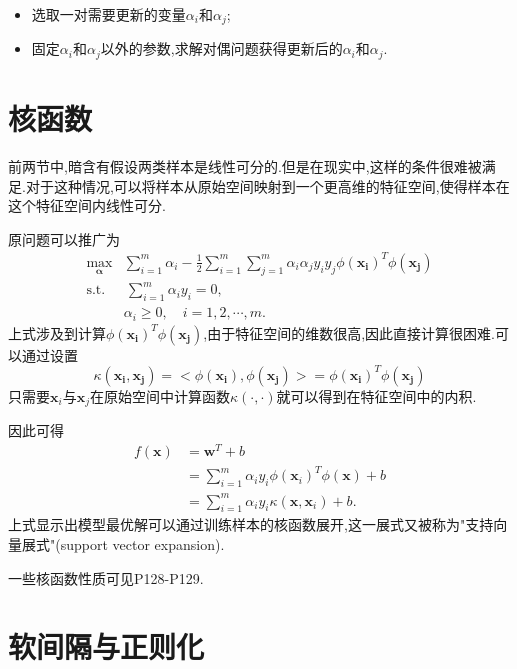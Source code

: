 \begin{itemize}
\item 选取一对需要更新的变量$\alpha_i$和$\alpha_j$;
\item 固定$\alpha_i$和$\alpha_j$以外的参数,求解对偶问题获得更新后的$\alpha_i$和$\alpha_j$.
\end{itemize}

\section{核函数}

前两节中,暗含有假设两类样本是线性可分的.但是在现实中,这样的条件很难被满足.对于这种情况,可以将样本从原始空间映射到一个更高维的特征空间,使得样本在这个特征空间内线性可分.

原问题可以推广为
\begin{equation}\begin{split}
\max_{\mathbf\alpha}&\sum_{i=1}^m\alpha_i-\frac{1}{2}\sum_{i=1}^m\sum_{j=1}^m\alpha_i\alpha_jy_iy_j\phi(\mathbf{x_i})^T\phi(\mathbf{x_j})\\
\text{s.t.}&\,\sum_{i=1}^m\alpha_iy_i=0,\\
&\alpha_i\ge 0,\quad i=1,2,\cdots,m.
\end{split}\end{equation}
上式涉及到计算$\phi(\mathbf{x_i})^T\phi(\mathbf{x_j})$,由于特征空间的维数很高,因此直接计算很困难.可以通过设置
\begin{equation}\kappa(\mathbf{x_i,x_j})=<\phi(\mathbf{x_i}),\phi(\mathbf{x_j})>=\phi(\mathbf{x_i})^T\phi(\mathbf{x_j})\end{equation}
只需要$\mathbf x_i$与$\mathbf x_j$在原始空间中计算函数$\kappa(\cdot,\cdot)$就可以得到在特征空间中的内积.

因此可得
\begin{equation}\begin{split}
f(\mathbf x)&=\mathbf w^T+b\\
&=\sum_{i=1}^m\alpha_iy_i\phi(\mathbf x_i)^T\phi(\mathbf x)+b\\
&=\sum_{i=1}^m\alpha_iy_i\kappa(\mathbf x,\mathbf x_i)+b.
\end{split}\end{equation}
上式显示出模型最优解可以通过训练样本的核函数展开,这一展式又被称为"支持向量展式"(support vector expansion).

一些核函数性质可见P128-P129.

\section{软间隔与正则化}

